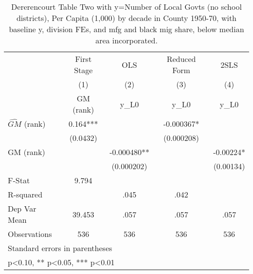 \begin{table}[htbp]\centering
\def\sym#1{\ifmmode^{#1}\else\(^{#1}\)\fi}
\caption{Dererencourt Table Two with y=Number of Local Govts (no school districts), Per Capita (1,000) by decade in County 1950-70, with baseline y, division FEs, and mfg and black mig share, below median area incorporated.}
\begin{tabular}{l*{4}{c}}
\toprule
                    & First Stage   &         OLS   &Reduced Form   &        2SLS   \\
                    &\multicolumn{1}{c}{(1)}&\multicolumn{1}{c}{(2)}&\multicolumn{1}{c}{(3)}&\multicolumn{1}{c}{(4)}\\
                    &\multicolumn{1}{c}{GM  (rank)}&\multicolumn{1}{c}{y\_L0}&\multicolumn{1}{c}{y\_L0}&\multicolumn{1}{c}{y\_L0}\\
\midrule
$\hat{GM}$ (rank)   &       0.164***&               &   -0.000367*  &               \\
                    &    (0.0432)   &               &  (0.000208)   &               \\
\addlinespace
GM  (rank)          &               &   -0.000480** &               &    -0.00224*  \\
                    &               &  (0.000202)   &               &   (0.00134)   \\
\midrule
F-Stat              &       9.794   &               &               &               \\
R-squared           &               &        .045   &        .042   &               \\
Dep Var Mean        &      39.453   &        .057   &        .057   &        .057   \\
Observations        &         536   &         536   &         536   &         536   \\
\bottomrule
\multicolumn{5}{l}{\footnotesize Standard errors in parentheses}\\
\multicolumn{5}{l}{\footnotesize * p<0.10, ** p<0.05, *** p<0.01}\\
\end{tabular}
\end{table}
